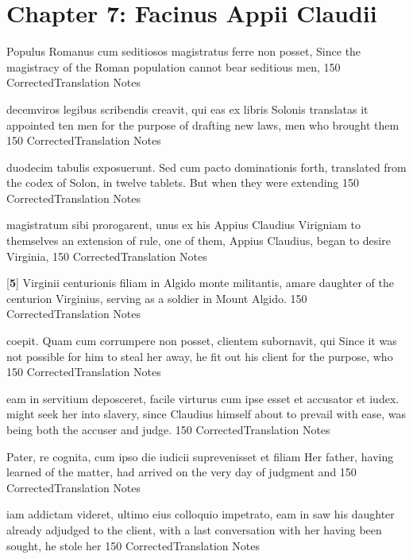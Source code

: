 \chapter*{Chapter 7:  Facinus Appii Claudii} %
\label{sec:chapter_7}

\latline
  {Populus Romanus cum seditiosos magistratus ferre non posset,}
  { Since the magistracy of the Roman population cannot bear seditious men, }
  {150}
  { CorrectedTranslation }
  { Notes }


\latline
  {decemviros legibus scribendis creavit, qui eas ex libris Solonis translatas}
  { it appointed ten men for the purpose of drafting new laws, men who brought them }
  {150}
  { CorrectedTranslation }
  { Notes }


\latline
  {duodecim tabulis exposuerunt.  Sed cum pacto dominationis}
  { forth, translated from the codex of Solon, in twelve tablets.  But when they were extending }
  {150}
  { CorrectedTranslation }
  { Notes }


\latline
  {magistratum sibi prorogarent, unus ex his Appius Claudius Virigniam}
  { to themselves an extension of rule, one of them, Appius Claudius, began to desire Virginia, }
  {150}
  { CorrectedTranslation }
  { Notes }


\latline
  {[\textbf{5}] Virginii centurionis filiam in Algido monte militantis, amare}
  { daughter of the centurion Virginius, serving as a soldier in Mount Algido. }
  {150}
  { CorrectedTranslation }
  { Notes }


\latline
  {coepit.  Quam cum corrumpere non posset, clientem subornavit, qui}
  { Since it was not possible for him to steal her away, he fit out his client for the purpose, who }
  {150}
  { CorrectedTranslation }
  { Notes }


\latline
  {eam in servitium deposceret, facile virturus cum ipse esset et accusator et iudex. }
  { might seek her into slavery, since Claudius himself about to prevail with ease, was being both the accuser and judge. }
  {150}
  { CorrectedTranslation }
  { Notes }


\latline
  {Pater, re cognita, cum ipso die iudicii suprevenisset et filiam }
  { Her father, having learned of the matter, had arrived on the very day of judgment and}
  {150}
  { CorrectedTranslation }
  { Notes }


\latline
  {iam addictam videret, ultimo eius colloquio impetrato, eam in }
  { saw his daughter already adjudged to the client, with a last conversation with her having been sought, he stole her }
  {150}
  { CorrectedTranslation }
  { Notes }


